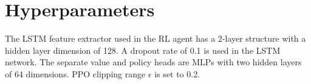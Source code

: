\section{Hyperparameters}
\label{sec:hyperparam}

The LSTM feature extractor used in the RL agent has a 2-layer structure with a hidden layer dimension of 128. A dropout rate of 0.1 is used in the LSTM network. The separate value and policy heads are MLPs with two hidden layers of 64 dimensions. PPO clipping range $\epsilon$ is set to 0.2.
